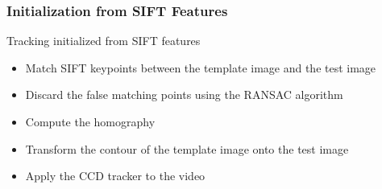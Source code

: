 \documentclass[english,10pt,presentation]{beamer}
\begin{document}
\begin{frame}
\frametitle{Initialization from SIFT Features}
\label{sec-5_3}
\begin{exampleblock}{Tracking initialized from SIFT features}
\label{sec-5_3_1}
\begin{itemize}

\item Match SIFT keypoints between the template image and the test image\\
\label{sec-5_3_1_1}%
\item Discard the false matching points using the RANSAC algorithm\\
\label{sec-5_3_1_2}%
\item Compute the homography\\
\label{sec-5_3_1_3}%
\item Transform the contour of the template image onto the test image\\
\label{sec-5_3_1_4}%
\item Apply the CCD tracker to the video\\
\label{sec-5_3_1_5}%
\end{itemize} %
\end{exampleblock}
\end{frame}
\end{document}

